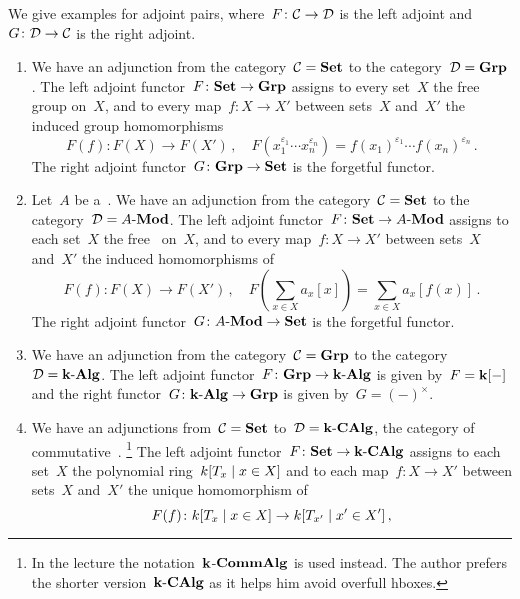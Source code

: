 \begin{example}
  We give examples for adjoint pairs, where~$F \colon \mathcal{C} \to \mathcal{D}$ is the left adjoint and~$G \colon \mathcal{D} \to \mathcal{C}$ is the right adjoint.
  \begin{enumerate}
    \item
      We have an adjunction from the category~$\mathcal{C} = \mathbf{Set}$ to the category~$\mathcal{D} = \mathbf{Grp}$.
      The left adjoint functor~$F \colon \mathbf{Set} \to \mathbf{Grp}$ assigns to every set~$X$ the free group on~$X$, and to every map~$f \colon X \to X'$ between sets~$X$ and~$X'$ the induced group homomorphisms
      \[
                F(f)
        \colon  F(X)
        \to     F(X') \,,
        \quad   F(x_1^{\varepsilon_1} \dotsm x_n^{\varepsilon_n})
        =       f(x_1)^{\varepsilon_1} \dotsm f(x_n)^{\varepsilon_n} \,.
      \]
      The right adjoint functor~$G \colon \mathbf{Grp} \to \mathbf{Set}$ is the forgetful functor.
    \item
      Let~$A$ be a~{\kalg}.
      We have an adjunction from the category~$\mathcal{C} = \mathbf{Set}$ to the category~$\mathcal{D} = \text{$A$-$\mathbf{Mod}$}$.
      The left adjoint functor~$F \colon \mathbf{Set} \to \text{$A$-$\mathbf{Mod}$}$ assigns to each set~$X$ the free~{} on~$X$, and to every map~$f \colon X \to X'$ between sets~$X$ and~$X'$ the induced homomorphisms of~{}
      \[
                F(f)
        \colon  F(X)
        \to     F(X') \,,
        \quad   F\left( \sum_{x \in X} a_x [x] \right)
        =       \sum_{x \in X} a_x [f(x)] \,.
      \]
      The right adjoint functor~$G \colon \text{$A$-$\mathbf{Mod}$} \to \mathbf{Set}$ is the forgetful functor.
    \item
      We have an adjunction from the category~$\mathcal{C} = \mathbf{Grp}$ to the category~$\mathcal{D} = \text{$\mathbf{k}$-$\mathbf{Alg}$}$.
      The left adjoint functor~$F \colon \mathbf{Grp} \to \text{$\mathbf{k}$-$\mathbf{Alg}$}$ is given by~$F = \mathbf{k}[-]$ and the right functor~$G \colon \text{$\mathbf{k}$-$\mathbf{Alg}$} \to \mathbf{Grp}$ is given by~$G = (-)^\times$.
    \item
      We have an adjunctions from~$\mathcal{C} = \mathbf{Set}$ to~$\mathcal{D} = \text{$\mathbf{k}$-$\mathbf{CAlg}$}$, the category of commutative~{\kalgs}.%
      \footnote{In the lecture the notation~$\mathbf{k}$\nobreakdash-$\mathbf{CommAlg}$ is used instead.
      The author prefers the shorter version~$\text{$\mathbf{k}$-$\mathbf{CAlg}$}$ as it helps him avoid overfull hboxes.}
      The left adjoint functor~$F \colon \mathbf{Set} \to \text{$\mathbf{k}$-$\mathbf{CAlg}$}$ assigns to each set~$X$ the polynomial ring~$k[T_x \suchthat x \in X]$ and to each map~$f \colon X \to X'$ between sets~$X$ and~$X'$ the unique homomorphism of~{\kalgs}
      \[
                F(f)
        \colon  k[T_x \suchthat x \in X]
        \to     k[T_{x'} \suchthat x' \in X'] \,,
\]
\end{enumerate}
\end{example}
